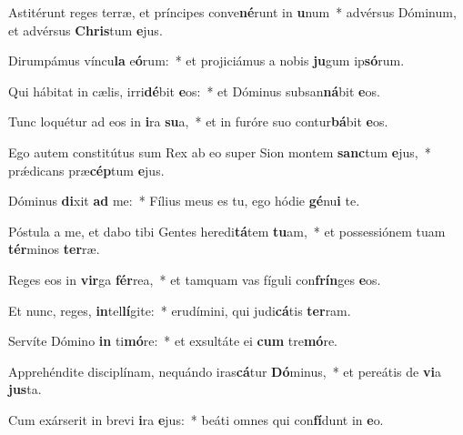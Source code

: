 \item Astitérunt reges terræ, et príncipes conve\textbf{né}runt in \textbf{u}num~* advérsus Dóminum, et advérsus \textbf{Chris}tum \textbf{e}jus.
\item Dirumpámus víncu\textbf{la} e\textbf{ó}rum:~* et projiciámus a nobis \textbf{ju}gum ip\textbf{só}rum.
\item Qui hábitat in cælis, irri\textbf{dé}bit \textbf{e}os:~* et Dóminus subsan\textbf{ná}bit \textbf{e}os.
\item Tunc loquétur ad eos in \textbf{i}ra \textbf{su}a,~* et in furóre suo contur\textbf{bá}bit \textbf{e}os.
\item Ego autem constitútus sum Rex ab eo super Sion montem \textbf{sanc}tum \textbf{e}jus,~* prǽdicans præ\textbf{cép}tum \textbf{e}jus.
\item Dóminus \textbf{di}xit \textbf{ad} me:~* Fílius meus es tu, ego hódie \textbf{gé}nu\textbf{i} te.
\item Póstula a me, et dabo tibi Gentes heredi\textbf{tá}tem \textbf{tu}am,~* et possessiónem tuam \textbf{tér}minos \textbf{ter}ræ.
\item Reges eos in \textbf{vir}ga \textbf{fér}rea,~* et tamquam vas fíguli con\textbf{frín}ges \textbf{e}os.
\item Et nunc, reges, \textbf{in}tel\textbf{lí}gite:~* erudímini, qui judi\textbf{cá}tis \textbf{ter}ram.
\item Servíte Dómino \textbf{in} ti\textbf{mó}re:~* et exsultáte ei \textbf{cum} tre\textbf{mó}re.
\item Apprehéndite disciplínam, nequándo iras\textbf{cá}tur \textbf{Dó}minus,~* et pereátis de \textbf{vi}a \textbf{jus}ta.
\item Cum exárserit in brevi \textbf{i}ra \textbf{e}jus:~* beáti omnes qui con\textbf{fí}dunt in \textbf{e}o.
